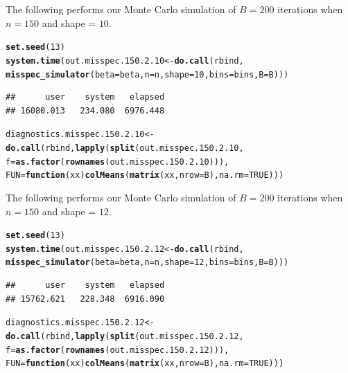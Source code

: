 \documentclass[11pt]{article}\usepackage[]{graphicx}\usepackage[]{color}
\makeatletter
\newcommand{\hlnum}[1]{\textcolor[rgb]{0.686,0.059,0.569}{#1}}%
\newcommand{\hlstd}[1]{\textcolor[rgb]{0.345,0.345,0.345}{#1}}%
\newcommand{\hlkwa}[1]{\textcolor[rgb]{0.161,0.373,0.58}{\textbf{#1}}}%
\newcommand{\hlkwb}[1]{\textcolor[rgb]{0.69,0.353,0.396}{#1}}%
\newcommand{\hlkwc}[1]{\textcolor[rgb]{0.333,0.667,0.333}{#1}}%
\newcommand{\hlkwd}[1]{\textcolor[rgb]{0.737,0.353,0.396}{\textbf{#1}}}%
\newenvironment{kframe}{%
 \def\at@end@of@kframe{}%
 \ifinner\ifhmode%
  \def\at@end@of@kframe{\end{minipage}}%
  \begin{minipage}{\columnwidth}%
 \fi\fi%
 \def\FrameCommand##1{\hskip\@totalleftmargin \hskip-\fboxsep
 \colorbox{shadecolor}{##1}\hskip-\fboxsep
     \hskip-\linewidth \hskip-\@totalleftmargin \hskip\columnwidth}%
 \MakeFramed {\advance\hsize-\width
   \@totalleftmargin\z@ \linewidth\hsize
   \@setminipage}}%
 {\par\unskip\endMakeFramed%
 \at@end@of@kframe}
\newenvironment{knitrout}{}{} %
\makeatother
\begin{document}
The following performs our Monte Carlo simulation of $B = 200$ iterations 
when $n = 150$ and shape = $10$.

\begin{knitrout}
\color{fgcolor}\begin{kframe}
\begin{alltt}
\hlkwd{set.seed}\hlstd{(}\hlnum{13}\hlstd{)}
\hlkwd{system.time}\hlstd{(out.misspec.150.2.10} \hlkwb{<-} \hlkwd{do.call}\hlstd{(rbind,}
  \hlkwd{misspec_simulator}\hlstd{(}\hlkwc{beta} \hlstd{= beta,} \hlkwc{n} \hlstd{= n,} \hlkwc{shape} \hlstd{=} \hlnum{10}\hlstd{,} \hlkwc{bins} \hlstd{= bins,} \hlkwc{B} \hlstd{= B)))}
\end{alltt}
\begin{verbatim}
##      user    system   elapsed 
## 16080.013   234.080  6976.448
\end{verbatim}
\begin{alltt}
\hlstd{diagnostics.misspec.150.2.10} \hlkwb{<-} \hlkwd{do.call}\hlstd{(rbind,} \hlkwd{lapply}\hlstd{(}\hlkwd{split}\hlstd{(out.misspec.150.2.10,}
  \hlkwc{f} \hlstd{=} \hlkwd{as.factor}\hlstd{(}\hlkwd{rownames}\hlstd{(out.misspec.150.2.10))),}
  \hlkwc{FUN} \hlstd{=} \hlkwa{function}\hlstd{(}\hlkwc{xx}\hlstd{)} \hlkwd{colMeans}\hlstd{(}\hlkwd{matrix}\hlstd{(xx,} \hlkwc{nrow} \hlstd{= B),} \hlkwc{na.rm} \hlstd{=} \hlnum{TRUE}\hlstd{)))}
\end{alltt}
\end{kframe}
\end{knitrout}


The following performs our Monte Carlo simulation of $B = 200$ iterations 
when $n = 150$ and shape = $12$.

\begin{knitrout}
\color{fgcolor}\begin{kframe}
\begin{alltt}
\hlkwd{set.seed}\hlstd{(}\hlnum{13}\hlstd{)}
\hlkwd{system.time}\hlstd{(out.misspec.150.2.12} \hlkwb{<-} \hlkwd{do.call}\hlstd{(rbind,}
  \hlkwd{misspec_simulator}\hlstd{(}\hlkwc{beta} \hlstd{= beta,} \hlkwc{n} \hlstd{= n,} \hlkwc{shape} \hlstd{=} \hlnum{12}\hlstd{,} \hlkwc{bins} \hlstd{= bins,} \hlkwc{B} \hlstd{= B)))}
\end{alltt}
\begin{verbatim}
##      user    system   elapsed 
## 15762.621   228.348  6916.090
\end{verbatim}
\begin{alltt}
\hlstd{diagnostics.misspec.150.2.12} \hlkwb{<-} \hlkwd{do.call}\hlstd{(rbind,} \hlkwd{lapply}\hlstd{(}\hlkwd{split}\hlstd{(out.misspec.150.2.12,}
  \hlkwc{f} \hlstd{=} \hlkwd{as.factor}\hlstd{(}\hlkwd{rownames}\hlstd{(out.misspec.150.2.12))),}
  \hlkwc{FUN} \hlstd{=} \hlkwa{function}\hlstd{(}\hlkwc{xx}\hlstd{)} \hlkwd{colMeans}\hlstd{(}\hlkwd{matrix}\hlstd{(xx,} \hlkwc{nrow} \hlstd{= B),} \hlkwc{na.rm} \hlstd{=} \hlnum{TRUE}\hlstd{)))}
\end{alltt}
\end{kframe}
\end{knitrout}
\end{document}
